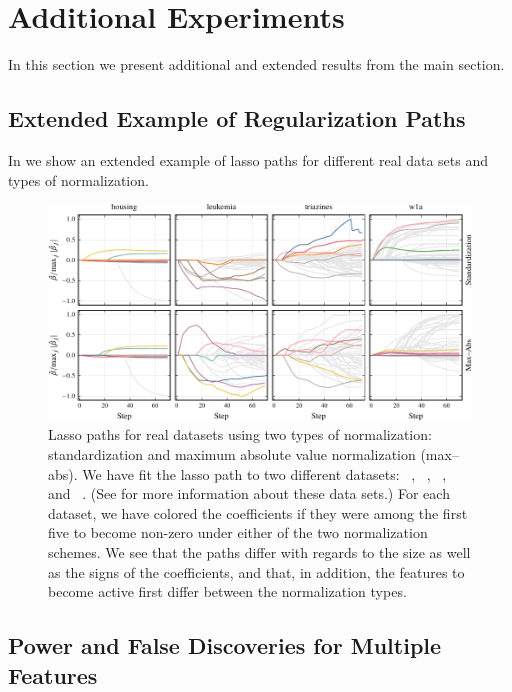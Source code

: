 \section{Additional Experiments}\label{sec:additional-results}

In this section we present additional and extended results from the main section.

\subsection{Extended Example of Regularization Paths}%
\label{sec:extended-real-data-paths}

In  we show an extended example of lasso paths for different
real data sets and types of normalization.

\begin{figure}[hbpt]
  \centering
  \includegraphics[]{plots/realdata_paths.pdf}
  \caption{%
    Lasso paths for real datasets using two types of normalization:
    standardization and maximum absolute value normalization (max--abs). We have fit
    the lasso path to two different datasets:
    ~\citep{harrison1978}, ~\citep{golub1999},
    ~\citep{king}, and ~\citep{platt1998}. (See 
    for more information about these data sets.) For each
    dataset, we have colored the coefficients if they were among the first five
    to become non-zero under either of the two normalization schemes. We see
    that the paths differ with regards to the size as well as the signs of the
    coefficients, and that, in addition, the features to become active first
    differ between the normalization types.
  }
  \label{fig:realdata-paths-full}
\end{figure}

\subsection{Power and False Discoveries for Multiple Features}%
\label{sec:power-fdr-multiple}

